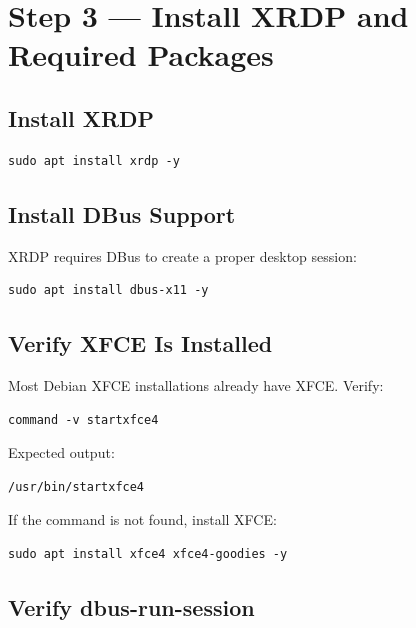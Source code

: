 \documentclass[a4paper,12pt]{article}
\begin{document}
\section{Step 3 --- Install XRDP and Required Packages}

\subsection{Install XRDP}

\begin{lstlisting}[style=bashstyle]
sudo apt install xrdp -y
\end{lstlisting}

\subsection{Install DBus Support}

XRDP requires DBus to create a proper desktop session:

\begin{lstlisting}[style=bashstyle]
sudo apt install dbus-x11 -y
\end{lstlisting}

\subsection{Verify XFCE Is Installed}

Most Debian XFCE installations already have XFCE. Verify:

\begin{lstlisting}[style=bashstyle]
command -v startxfce4
\end{lstlisting}

Expected output:

\begin{lstlisting}[style=textstyle]
/usr/bin/startxfce4
\end{lstlisting}

If the command is not found, install XFCE:

\begin{lstlisting}[style=bashstyle]
sudo apt install xfce4 xfce4-goodies -y
\end{lstlisting}

\subsection{Verify dbus-run-session}
\end{document}
